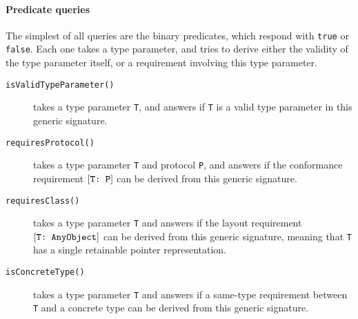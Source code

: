 \documentclass[../generics]{subfiles}
\begin{document}
\paragraph{Predicate queries}
The simplest of all queries are the binary predicates, which respond with \texttt{true} or \texttt{false}. Each one takes a type parameter, and tries to derive either the validity of the type parameter itself, or a requirement involving this type parameter.
\begin{description}
\item [\texttt{isValidTypeParameter()}] takes a type parameter \texttt{T}, and answers if \texttt{T} is a valid type parameter in this generic signature.

\item [\texttt{requiresProtocol()}] takes a type parameter \texttt{T} and protocol \texttt{P}, and answers if the conformance requirement $[\texttt{T:~P}]$ can be derived from this generic signature.

\item [\texttt{requiresClass()}] takes a type parameter \texttt{T} and answers if the layout requirement $[\texttt{T:~AnyObject}]$ can be derived from this generic signature, meaning that \texttt{T} has a single retainable pointer representation.

\item [\texttt{isConcreteType()}] takes a type parameter \texttt{T} and answers if a same-type requirement between \texttt{T} and a concrete type can be derived from this generic signature.
\end{description}
\end{document}
